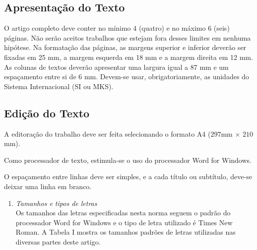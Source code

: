 \documentclass{ceel}
\begin{document}
\begin{multicols}{2}
\subsection{Apresentação do Texto}
O artigo completo deve conter no mínimo 4 (quatro) e no máximo 6 (seis) páginas. Não serão aceitos trabalhos que estejam fora desses limites em nenhuma hipótese. 
Na formatação das páginas, as margens superior e inferior deverão ser fixadas em 25 mm, a margem esquerda em 18 mm e a margem direita em 12 mm. As colunas de textos deverão apresentar uma largura igual a 87 mm e um espaçamento entre si de 6 mm.
Devem-se usar, obrigatoriamente, as unidades do Sistema Internacional (SI ou MKS).

\subsection{Edição do Texto}
A editoração do trabalho deve ser feita selecionando o formato A4 ($297$mm $\times$ $210$mm).

Como processador de texto, estimula-se o uso do processador Word for Windows. 

O espaçamento entre linhas deve ser simples, e a cada título ou subtítulo, deve-se deixar uma linha em branco.


\begin{enumerate}[1)]
\item \emph{Tamanhos e tipos de letras}\\
Os tamanhos das letras especificadas nesta norma seguem o padrão do processador Word for Windows e o tipo de letra utilizado é Times New Roman. A Tabela I mostra os tamanhos padrões de letras utilizadas nas diversas partes deste artigo. 


\end{enumerate}
\end{multicols}
\end{document}

